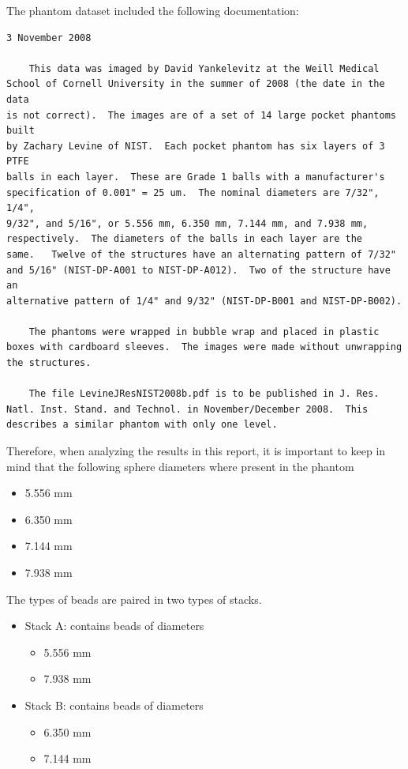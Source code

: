 \documentclass{InsightArticle}
\begin{document}
The phantom dataset included the following documentation:

\begin{verbatim}
3 November 2008

	This data was imaged by David Yankelevitz at the Weill Medical
School of Cornell University in the summer of 2008 (the date in the data
is not correct).  The images are of a set of 14 large pocket phantoms built
by Zachary Levine of NIST.  Each pocket phantom has six layers of 3 PTFE
balls in each layer.  These are Grade 1 balls with a manufacturer's
specification of 0.001" = 25 um.  The nominal diameters are 7/32", 1/4",
9/32", and 5/16", or 5.556 mm, 6.350 mm, 7.144 mm, and 7.938 mm,
respectively.  The diameters of the balls in each layer are the
same.   Twelve of the structures have an alternating pattern of 7/32"
and 5/16" (NIST-DP-A001 to NIST-DP-A012).  Two of the structure have an
alternative pattern of 1/4" and 9/32" (NIST-DP-B001 and NIST-DP-B002).

	The phantoms were wrapped in bubble wrap and placed in plastic
boxes with cardboard sleeves.  The images were made without unwrapping
the structures.

	The file LevineJResNIST2008b.pdf is to be published in J. Res.
Natl. Inst. Stand. and Technol. in November/December 2008.  This
describes a similar phantom with only one level.
\end{verbatim}

Therefore, when analyzing the results in this report, it is important to keep
in mind that the following sphere diameters where present in the phantom

\begin{itemize}
\item 5.556 mm
\item 6.350 mm
\item 7.144 mm
\item 7.938 mm
\end{itemize}

The types of beads are paired in two types of stacks.

\begin{itemize}
\item Stack A: contains beads of diameters
\begin{itemize}
\item 5.556 mm
\item 7.938 mm
\end{itemize}
\item Stack B: contains beads of diameters
\begin{itemize}
\item 6.350 mm
\item 7.144 mm
\end{itemize}
\end{itemize}
\end{document}
